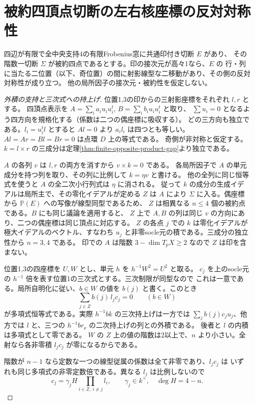 \section{被約四頂点切断の左右核座標の反対対称性}
\label{sec:finite-tetrahedral-kernel-symmetry}
\begin{theorem}\label{thm:finite-tetrahedral-kernel-symmetry}
四辺が有限で全中央支持4の有限Frobenius窓に共通印付き切断 $E$ があり、
その階数一切断 $\Sigma$ が被約四点であるとする。印の接次元が高々1なら、$E$ の
行・列に当たる二位置（以下、奇位置）の間に射影線型な二移動があり、その側の反対対称性が成り立つ。
他の局所因子の接次元・被約性を仮定しない。
\end{theorem}
\begin{proof}[外積の支持と三次式への持上げ]
位置1,3の印からの三射影座標をそれぞれ $l,r$ とする。
四頂点表示を $A=\sum_i a_i u_i u_i^t$, $B=\sum_i b_i u_i u_i^t$ と取り、
$\sum u_i=0$ となるよう四方向を規格化する（係数は二つの偶座標に吸収する）。
どの三方向も独立である。$l_i=u_i^tl$ とすると $Al=0$ より
$a_i l_i$ は四つとも等しい。$Al=Ar=Bl=Br=0$ は点環 $D$ 上の等式である。
奇側が非対称と仮定する。$k=l\times r$ の三成分は定理\ref{thm:finite-opposite-product-gap}より独立である。

$A$ の各列 $v$ は $l,r$ の両方を消すから $v\times k=0$ である。
各局所因子で $A$ の単元成分を持つ列を取り、その列に比例して $k=\eta v$ と書ける。
他の全列に同じ恒等式を使うと $A$ の全二次小行列式は $\eta$ に消される。
従って $k$ の成分の生成イデアルは局所主で、その零化イデアルが定める $Z$ は
$A$ により $\Sigma$ に入る。偶座標から $\mathbb P(E)$ への写像が線型同型であるため、
$Z$ は相異なる $n\le4$ 個の被約点である。$B$ にも同じ議論を適用すると、
$Z$ 上で $A,B$ の列は同じ $v$ の方向にあり、二つの偶座標は同じ頂点に対応する。
$Z$ の各点 $j$ での $k$ は零化イデアルが極大イデアルのベクトル、すなわち
$u_j$ と非零socle元の積である。三成分の独立性から $n=3,4$ である。
印での $A$ は階数 $3-\dim T_pX\ge2$ なので $Z$ は印を含まない。

位置1,3の四座標を $U,W$ とし、単元 $h$ を $h^{-1}W^2=U^2$ と取る。
$c_j$ を上のsocle元の $h^{-1}$ 倍を表す位置1の三次式とする。三次制限が同型なので
これは一意である。局所自明化に従い、$b\in W$ の値を $b(j)$ と書く。このとき
\[
                    \sum_{j\in Z} b(j)\,l_j c_j=0
                    \qquad (b\in W)
\]
が多項式恒等式である。実際 $h^{-1}b k$ の三次持上げは一方では
$\sum_j b(j)c_j u_j$、他方では $l$ と、三つの $h^{-1}b r_\nu$ の二次持上げの列との外積である。
後者と $l$ の内積は多項式として零である。
$W$ の $Z$ 上の値の階数は2以上で、$n$ より小さい。全射なら各非零積 $l_j c_j$ が零になるからである。

階数が $n-1$ なら定数な一つの線型従属の係数は全て非零であり、$l_j c_j$ は
いずれも同じ多項式の非零定数倍である。異なる $l_j$ は比例しないので
\[
                    c_j=\gamma_j H\prod_{i\in Z,\ i\ne j}l_i ,
      \qquad \gamma_j\in k^\times,\quad\deg H=4-n .
\]
\end{proof}

